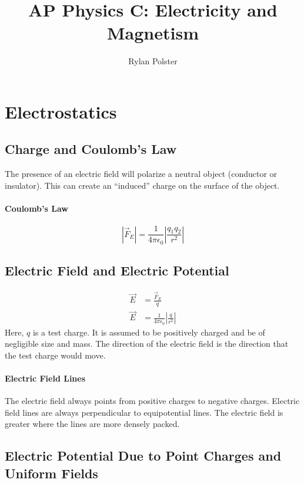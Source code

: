 \documentclass{article}
\title{AP Physics C: Electricity and Magnetism}
\author{Rylan Polster}
\begin{document}
    \maketitle

    \section{Electrostatics}

        \subsection{Charge and Coulomb's Law}
            The presence of an electric field will polarize a neutral object (conductor or insulator). This can create an “induced” charge on the surface of the object.

            \paragraph{Coulomb's Law}
            \begin{equation}
                \left| \vec{F}_E \right| = \frac{1}{4 \pi \epsilon_0} \left| \frac{q_1 q_2}{r^2} \right|
            \end{equation}

        \subsection{Electric Field and Electric Potential}
            \begin{align}
                \vec{E} &= \frac{\vec{F}_E}{q} \\
                \vec{E} &= \frac{1}{4 \pi \epsilon_0} \left| \frac{q}{r^2} \right|
            \end{align}
            Here, $q$ is a test charge. It is assumed to be positively charged and be of negligible size and mass. The direction of the electric field is the direction that the test charge would move.

            \paragraph{Electric Field Lines}
            The electric field always points from positive charges to negative charges. Electric field lines are always perpendicular to equipotential lines. The electric field is greater where the lines are more densely packed.

        \subsection{Electric Potential Due to Point Charges and Uniform Fields}
\end{document}
